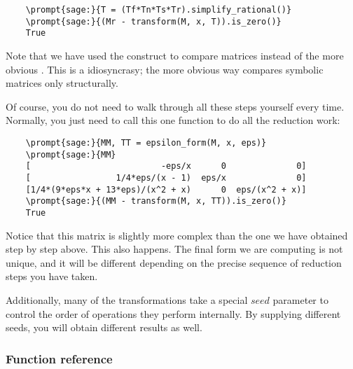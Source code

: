 \documentclass[12pt,a4paper]{article}
\begin{document}
\begin{Verbatim}
    \prompt{sage:}{T = (Tf*Tn*Ts*Tr).simplify_rational()}
    \prompt{sage:}{(Mr - transform(M, x, T)).is_zero()}
    True
\end{Verbatim}

Note that we have used the construct  to compare matrices instead of the more obvious .
This is a \sage idiosyncrasy; the more obvious way compares symbolic matrices only structurally.

Of course, you do not need to walk through all these steps yourself every time.
Normally, you just need to call this one function to do all the reduction work:

\begin{Verbatim}
    \prompt{sage:}{MM, TT = epsilon_form(M, x, eps)}
    \prompt{sage:}{MM}
    [                          -eps/x      0              0]
    [                 1/4*eps/(x - 1)  eps/x              0]
    [1/4*(9*eps*x + 13*eps)/(x^2 + x)      0  eps/(x^2 + x)]
    \prompt{sage:}{(MM - transform(M, x, TT)).is_zero()}
    True
\end{Verbatim}

Notice that this matrix is slightly more complex than the one we have obtained step by step above.
This also happens.
The final form we are computing is not unique, and it will be different depending on the precise sequence of reduction steps you have taken.

Additionally, many of the transformations take a special $seed$ parameter to control the order of operations they perform internally.
By supplying different seeds, you will obtain different results as well.

\subsubsection{Function reference}
\end{document}
